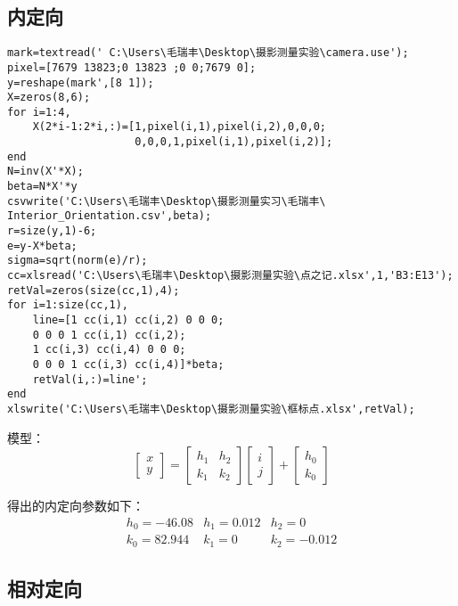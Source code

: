 \subsection{内定向}

\begin{lstlisting}[caption=Interior\_Orientation.m文件]
mark=textread(' C:\Users\毛瑞丰\Desktop\摄影测量实验\camera.use');
pixel=[7679 13823;0 13823 ;0 0;7679 0];
y=reshape(mark',[8 1]);
X=zeros(8,6); 
for i=1:4,
    X(2*i-1:2*i,:)=[1,pixel(i,1),pixel(i,2),0,0,0;
                    0,0,0,1,pixel(i,1),pixel(i,2)];
end
N=inv(X'*X);
beta=N*X'*y
csvwrite('C:\Users\毛瑞丰\Desktop\摄影测量实习\毛瑞丰\ Interior_Orientation.csv',beta);
r=size(y,1)-6;
e=y-X*beta;
sigma=sqrt(norm(e)/r);
cc=xlsread('C:\Users\毛瑞丰\Desktop\摄影测量实验\点之记.xlsx',1,'B3:E13');
retVal=zeros(size(cc,1),4);
for i=1:size(cc,1),
    line=[1 cc(i,1) cc(i,2) 0 0 0;
    0 0 0 1 cc(i,1) cc(i,2);
    1 cc(i,3) cc(i,4) 0 0 0;
    0 0 0 1 cc(i,3) cc(i,4)]*beta;
    retVal(i,:)=line';
end
xlswrite('C:\Users\毛瑞丰\Desktop\摄影测量实验\框标点.xlsx',retVal);
\end{lstlisting}

模型：
\begin{equation}
\begin{bmatrix}
x \\ y
\end{bmatrix}
=\begin{bmatrix}
h_1 & h_2 \\
k_1 & k_2 
\end{bmatrix}
\begin{bmatrix}
i \\ j
\end{bmatrix}
+\begin{bmatrix}
h_0 \\ k_0
\end{bmatrix}
\end{equation}

得出的内定向参数如下：
\begin{equation}
\begin{array}{lll}
h_0=-46.08 & h_1=0.012 & h_2=0 \\
k_0=82.944 & k_1=0 & k_2=-0.012
\end{array}
\end{equation}

\subsection{相对定向}


